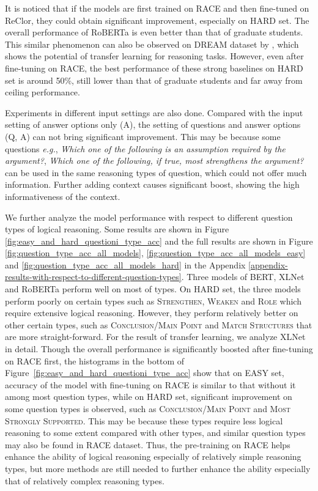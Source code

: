 \documentclass{article} \usepackage{iclr2020_conference,times}
\newcommand\bertlarge{BERT\xspace}
\newcommand\xlnetlarge{XLNet\xspace}
\newcommand\robertalarge{RoBERTa\xspace}
\begin{document}
It is noticed that if the models are first trained on RACE and then fine-tuned on ReClor, they could obtain significant improvement, especially on HARD set. The overall performance of \robertalarge is even better than that of graduate students. This similar phenomenon can also be observed on DREAM dataset \citep{sun2019dream} by \citet{jin2019mmm}, which shows the potential of transfer learning for reasoning tasks. However, even after fine-tuning on RACE, the best performance of these strong baselines on HARD set is around 50\%, still lower than that of graduate students and far away from ceiling performance.  

Experiments in different input settings are also done. Compared with the input setting of answer options only (A), the setting of questions and answer options (Q, A) can not bring significant improvement. This may be because some questions \textit{e.g.}, \textit{Which one of the following is an assumption required by the argument?}, \textit{Which one of the following, if true, most strengthens the argument?} can be used in the same reasoning types of question, which could not offer much information. Further adding context causes significant boost, showing the high informativeness of the context. 

We further analyze the model performance with respect to different question types of logical reasoning. Some results are shown in Figure \ref{fig:easy_and_hard_questioni_type_acc} and the full results are shown in Figure \ref{fig:question_type_acc_all_models}, \ref{fig:question_type_acc_all_models_easy} and \ref{fig:question_type_acc_all_models_hard} in the Appendix \ref{appendix-results-with-respect-to-different-question-types}. Three models of \bertlarge, \xlnetlarge and \robertalarge perform well on most of types. On HARD set, the three models perform poorly on certain types such as \textsc{Strengthen}, \textsc{Weaken} and \textsc{Role} which require extensive logical reasoning. However, they perform relatively better on other certain types, such as \textsc{Conclusion/Main Point} and \textsc{Match Structures} that are more straight-forward. For the result of transfer learning, we analyze \xlnetlarge in detail. Though the overall performance is significantly boosted after fine-tuning on RACE first, the histograms in the bottom of Figure~\ref{fig:easy_and_hard_questioni_type_acc} show that on EASY set, accuracy of the model with fine-tuning on RACE is similar to that without it among most question types, while on HARD set, significant improvement on some question types is observed, such as \textsc{Conclusion/Main Point} and \textsc{Most Strongly Supported}. This may be because these types require less logical reasoning to some extent compared with other types, and similar question types may also be found in RACE dataset. Thus, the pre-training on RACE helps enhance the ability of logical reasoning especially of relatively simple reasoning types, but more methods are still needed to further enhance the ability especially that of relatively complex reasoning types. 
\end{document}
